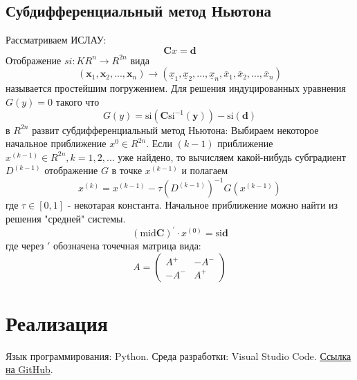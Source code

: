 \documentclass[a4paper,12pt]{article}
\begin{document}
    \subsection{Субдифференциальный метод Ньютона}
    Рассматриваем ИСЛАУ:
    \begin{equation}
        \textbf{C}x = \textbf{d}
        \label{eq:subdiffgeneraltask}
    \end{equation}
    Отображение $ si: KR^{n} \to R^{2n} $ вида
    \begin{equation}
        (\textbf{x}_{1}, \textbf{x}_{2}, ..., \textbf{x}_{n}) \to 
        (\underline{x}_{1}, \underline{x}_{2}, ..., \underline{x}_{n}, \overline{x}_{1}, \overline{x}_{2}, ..., \overline{x}_{n})
    \end{equation}
    называется простейшим погружением. \newline
    Для решения индуцированных уравнения $ G(y) = 0 $ такого что
    \begin{equation}
        G(y) = \text{si}(\textbf{C}\text{si}^{-1}(\textbf{y})) - \text{si}(\textbf{d})
    \end{equation}
    в $ R^{2n} $ развит субдифференциальный метод Ньютона: \newline
    Выбираем некоторое начальное приближение $ x^{0} \in R^{2n} $. Если $ (k - 1) $ приближение $ x^{(k - 1)} \in R^{2n}, k = 1, 2, ... $ уже найдено,
    то вычисляем какой-нибудь субградиент $ D^{(k - 1)} $ отображение $ G $ в точке $ x^{(k - 1)} $ и полагаем
    \begin{equation}
        x^{(k)} = x^{(k - 1)} - \tau(D^{(k - 1)})^{-1}G(x^{(k - 1)})
        \label{eq:itersubdiff}
    \end{equation}
    где $ \tau \in [0, 1] $ - некотарая константа.
    Начальное приближение можно найти из решения "средней" системы.
    \begin{equation}
        (\text{mid}\textbf{C})^{'} \cdot x^{(0)} = \text{si}\textbf{d}
    \end{equation}
    где через $ ' $ обозначена точечная матрица вида:
    \begin{equation}
        A = 
        \begin{pmatrix}
            A^{+} & -A^{-} \\
            -A^{-} & A^{+}    
        \end{pmatrix}
    \end{equation}
 
    \section{Реализация}
    Язык программирования: Python. Среда разработки: Visual Studio Code.
    \href{https://github.com/kirillkuks/IntervalAnalysis/tree/master/Lab4}{Ссылка на GitHub}.
\end{document}
